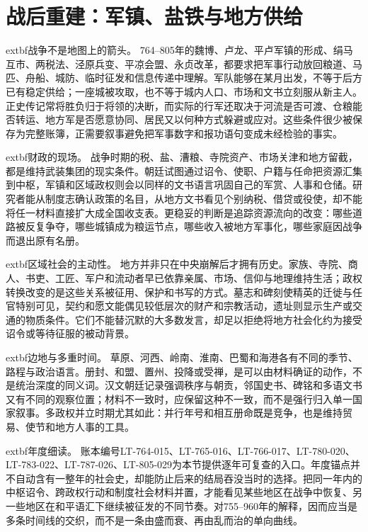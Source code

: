 \section{战后重建：军镇、盐铁与地方供给}
\label{sec:postwar-military-fiscal-reconstruction}

\noindent	extbf{战争不是地图上的箭头。} 764--805年的魏博、卢龙、平卢军镇的形成、绢马互市、两税法、泾原兵变、平凉会盟、永贞改革，都要求把军事行动放回粮道、马匹、舟船、城防、临时征发和信息传递中理解。军队能够在某月出发，不等于后方已有稳定供给；一座城被攻取，也不等于城内人口、市场和文书立刻服从新主人。正史传记常将胜负归于将领的决断，而实际的行军还取决于河流是否可渡、仓粮能否转运、地方军是否愿意协同、居民又以何种方式躲避或应对。这些条件很少被保存为完整账簿，正需要叙事避免把军事数字和报功语句变成未经检验的事实。

\noindent	extbf{财政的现场。} 战争时期的税、盐、漕粮、寺院资产、市场关津和地方留截，都是维持武装集团的现实条件。朝廷试图通过诏令、使职、户籍与任命把资源汇集到中枢，军镇和区域政权则会以同样的文书语言巩固自己的军赏、人事和仓储。研究者能从制度志确认政策的名目，从地方文书看见个别纳税、借贷或役使，却不能将任一材料直接扩大成全国收支表。更稳妥的判断是追踪资源流向的改变：哪些道路被反复争夺，哪些城镇成为粮运节点，哪些收入被地方军事化，哪些家庭因战争而退出原有名册。

\noindent	extbf{区域社会的主动性。} 地方并非只在中央崩解后才拥有历史。家族、寺院、商人、书吏、工匠、军户和流动者早已依靠亲属、市场、信仰与地理维持生活；政权转换改变的是这些关系被征用、保护和书写的方式。墓志和碑刻使精英的迁徙与任官特别可见，契约和愿文能偶见较低层次的财产和宗教活动，遗址则显示生产或交通的物质条件。它们不能替沉默的大多数发言，却足以拒绝将地方社会化约为接受诏令或等待征服的被动背景。

\noindent	extbf{边地与多重时间。} 草原、河西、岭南、淮南、巴蜀和海港各有不同的季节、路程与政治语言。册封、和盟、置州、投降或受禅，是可以由材料确证的动作，不是统治深度的同义词。汉文朝廷记录强调秩序与朝贡，邻国史书、碑铭和多语文书又有不同的观察位置；材料不一致时，应保留这种不一致，而不是强行归入单一国家叙事。多政权并立时期尤其如此：并行年号和相互册命既是竞争，也是维持贸易、使节和地方人事的工具。

\noindent	extbf{年度细读。} 账本编号LT-764-015、LT-765-016、LT-766-017、LT-780-020、LT-783-022、LT-787-026、LT-805-029为本节提供逐年可复查的入口。年度锚点并不自动含有一整年的社会史，却能防止后来的结局吞没当时的选择。把同一年内的中枢诏令、跨政权行动和制度社会材料并置，才能看见某些地区在战争中恢复、另一些地区在和平语汇下继续被征发的不同节奏。对755--960年的解释，因而应当是多条时间线的交织，而不是一条由盛而衰、再由乱而治的单向曲线。

